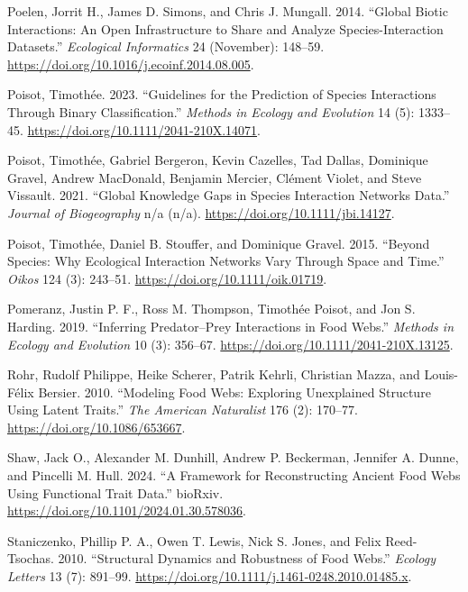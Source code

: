 \documentclass[
  letterpaper,
  DIV=11,
  numbers=noendperiod]{scrartcl}
\newlength{\cslhangindent}
\newenvironment{CSLReferences}[2] %
 {\begin{list}{}{%
  \setlength{\itemindent}{0pt}
  \setlength{\leftmargin}{0pt}
  \setlength{\parsep}{0pt}
  \ifodd #1
   \setlength{\leftmargin}{\cslhangindent}
   \setlength{\itemindent}{-1\cslhangindent}
  \fi
  \setlength{\itemsep}{#2\baselineskip}}}
 {\end{list}}
\begin{document}
\begin{CSLReferences}{1}{0}
Poelen, Jorrit H., James D. Simons, and Chris J. Mungall. 2014.
{``Global Biotic Interactions: {An} Open Infrastructure to Share and
Analyze Species-Interaction Datasets.''} \emph{Ecological Informatics}
24 (November): 148--59.
\url{https://doi.org/10.1016/j.ecoinf.2014.08.005}.

Poisot, Timothée. 2023. {``Guidelines for the Prediction of Species
Interactions Through Binary Classification.''} \emph{Methods in Ecology
and Evolution} 14 (5): 1333--45.
\url{https://doi.org/10.1111/2041-210X.14071}.

Poisot, Timothée, Gabriel Bergeron, Kevin Cazelles, Tad Dallas,
Dominique Gravel, Andrew MacDonald, Benjamin Mercier, Clément Violet,
and Steve Vissault. 2021. {``Global Knowledge Gaps in Species
Interaction Networks Data.''} \emph{Journal of Biogeography} n/a (n/a).
\url{https://doi.org/10.1111/jbi.14127}.

Poisot, Timothée, Daniel B. Stouffer, and Dominique Gravel. 2015.
{``Beyond Species: Why Ecological Interaction Networks Vary Through
Space and Time.''} \emph{Oikos} 124 (3): 243--51.
\url{https://doi.org/10.1111/oik.01719}.

Pomeranz, Justin P. F., Ross M. Thompson, Timothée Poisot, and Jon S.
Harding. 2019. {``Inferring Predator--Prey Interactions in Food Webs.''}
\emph{Methods in Ecology and Evolution} 10 (3): 356--67.
\url{https://doi.org/10.1111/2041-210X.13125}.

Rohr, Rudolf Philippe, Heike Scherer, Patrik Kehrli, Christian Mazza,
and Louis-Félix Bersier. 2010. {``Modeling {Food Webs}: {Exploring
Unexplained Structure Using Latent Traits}.''} \emph{The American
Naturalist} 176 (2): 170--77. \url{https://doi.org/10.1086/653667}.

Shaw, Jack O., Alexander M. Dunhill, Andrew P. Beckerman, Jennifer A.
Dunne, and Pincelli M. Hull. 2024. {``A Framework for Reconstructing
Ancient Food Webs Using Functional Trait Data.''} bioRxiv.
\url{https://doi.org/10.1101/2024.01.30.578036}.

Staniczenko, Phillip P. A., Owen T. Lewis, Nick S. Jones, and Felix
Reed-Tsochas. 2010. {``Structural Dynamics and Robustness of Food
Webs.''} \emph{Ecology Letters} 13 (7): 891--99.
\url{https://doi.org/10.1111/j.1461-0248.2010.01485.x}.


\end{CSLReferences}
\end{document}
